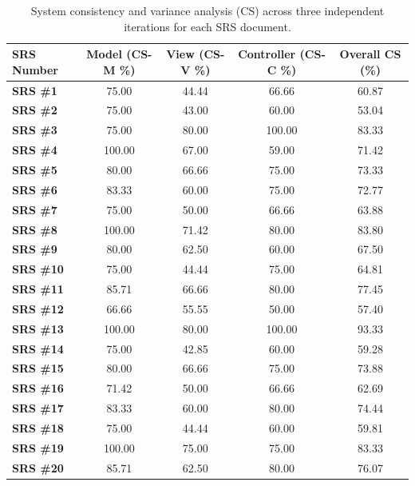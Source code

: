 \begin{table}[htbp]
\centering
\caption{System consistency and variance analysis (CS) across three independent iterations for each SRS document.}
\label{tab:consistency_results}
\renewcommand{\arraystretch}{1.1} 
\begin{tabular}{lcccc}
\toprule
\textbf{SRS Number} & \textbf{Model (CS-M \%)} & \textbf{View (CS-V \%)} & \textbf{Controller (CS-C \%)} & \textbf{Overall CS (\%)} \\
\midrule
\textbf{SRS \#1}  & 75.00 & 44.44 & 66.66 & 60.87 \\
\textbf{SRS \#2}  & 75.00 & 43.00 & 60.00 & 53.04 \\
\textbf{SRS \#3}  & 75.00 & 80.00 & 100.00& 83.33 \\
\textbf{SRS \#4}  & 100.00& 67.00 & 59.00 & 71.42 \\
\textbf{SRS \#5}  & 80.00 & 66.66 & 75.00 & 73.33 \\
\textbf{SRS \#6}  & 83.33 & 60.00 & 75.00 & 72.77 \\
\textbf{SRS \#7}  & 75.00 & 50.00 & 66.66 & 63.88 \\
\textbf{SRS \#8}  & 100.00& 71.42 & 80.00 & 83.80 \\
\textbf{SRS \#9}  & 80.00 & 62.50 & 60.00 & 67.50 \\
\textbf{SRS \#10} & 75.00 & 44.44 & 75.00 & 64.81 \\
\textbf{SRS \#11} & 85.71 & 66.66 & 80.00 & 77.45 \\
\textbf{SRS \#12} & 66.66 & 55.55 & 50.00 & 57.40 \\
\textbf{SRS \#13} & 100.00& 80.00 & 100.00& 93.33 \\
\textbf{SRS \#14} & 75.00 & 42.85 & 60.00 & 59.28 \\
\textbf{SRS \#15} & 80.00 & 66.66 & 75.00 & 73.88 \\
\textbf{SRS \#16} & 71.42 & 50.00 & 66.66 & 62.69 \\
\textbf{SRS \#17} & 83.33 & 60.00 & 80.00 & 74.44 \\
\textbf{SRS \#18} & 75.00 & 44.44 & 60.00 & 59.81 \\
\textbf{SRS \#19} & 100.00& 75.00 & 75.00 & 83.33 \\
\textbf{SRS \#20} & 85.71 & 62.50 & 80.00 & 76.07 \\
\bottomrule
\end{tabular}
\end{table}

